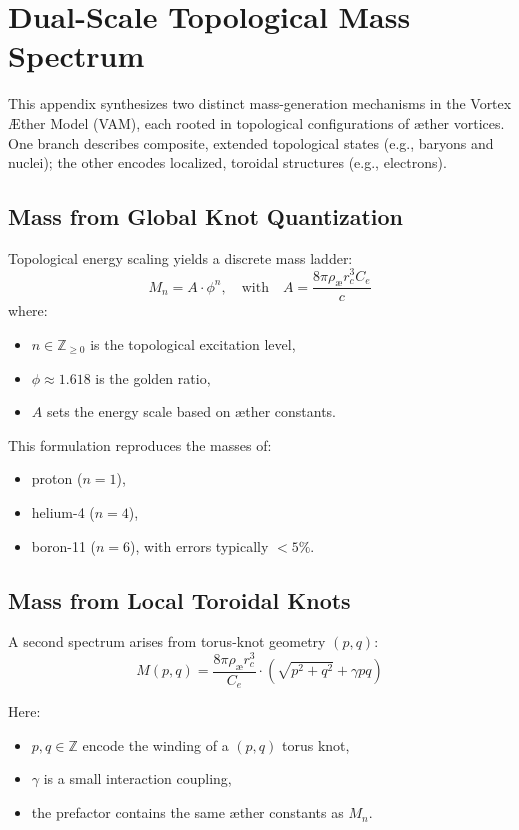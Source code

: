\section{Dual-Scale Topological Mass Spectrum}
This appendix synthesizes two distinct mass-generation mechanisms in the Vortex Æther Model (VAM), each rooted in topological configurations of æther vortices. One branch describes composite, extended topological states (e.g., baryons and nuclei); the other encodes localized, toroidal structures (e.g., electrons).

\subsection{Mass from Global Knot Quantization}

Topological energy scaling yields a discrete mass ladder:
\begin{equation}
M_n = A \cdot \phi^n, \quad \text{with} \quad
A = \frac{8\pi \rho_{\text{æ}} r_c^3 C_e}{c}
\end{equation}
where:
\begin{itemize}
  \item $n \in \mathbb{Z}_{\geq 0}$ is the topological excitation level,
  \item $\phi \approx 1.618$ is the golden ratio,
  \item $A$ sets the energy scale based on æther constants.
\end{itemize}

This formulation reproduces the masses of:
\begin{itemize}
  \item proton ($n=1$),
  \item helium-4 ($n=4$),
  \item boron-11 ($n=6$),
  with errors typically $< 5\%$.
\end{itemize}

\subsection{Mass from Local Toroidal Knots}

A second spectrum arises from torus-knot geometry $(p,q)$:
\begin{equation}
M(p,q) = \frac{8\pi \rho_{\text{æ}} r_c^3}{C_e} \cdot \left( \sqrt{p^2 + q^2} + \gamma pq \right)
\end{equation}

Here:
\begin{itemize}
  \item $p, q \in \mathbb{Z}$ encode the winding of a $(p,q)$ torus knot,
  \item $\gamma$ is a small interaction coupling,
  \item the prefactor contains the same æther constants as $M_n$.
\end{itemize}

